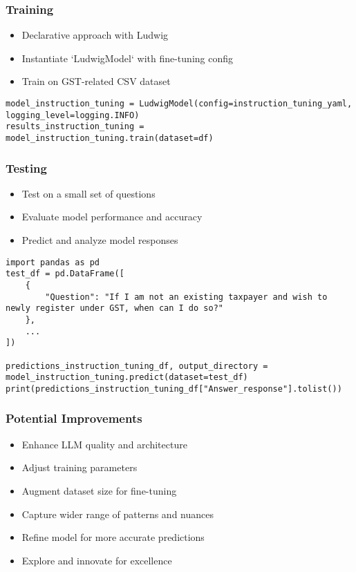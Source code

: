 \begin{frame}[fragile]\frametitle{Training}
\begin{itemize}
\item Declarative approach with Ludwig
\item Instantiate `LudwigModel` with fine-tuning config
\item Train on GST-related CSV dataset
\end{itemize}

\begin{lstlisting}
model_instruction_tuning = LudwigModel(config=instruction_tuning_yaml, logging_level=logging.INFO)
results_instruction_tuning = model_instruction_tuning.train(dataset=df)
\end{lstlisting}

\end{frame}

\begin{frame}[fragile]\frametitle{Testing}
\begin{itemize}
\item Test on a small set of questions
\item Evaluate model performance and accuracy
\item Predict and analyze model responses
\end{itemize}

\begin{lstlisting}
import pandas as pd
test_df = pd.DataFrame([
    {
        "Question": "If I am not an existing taxpayer and wish to newly register under GST, when can I do so?"
    },
    ...
])

predictions_instruction_tuning_df, output_directory = model_instruction_tuning.predict(dataset=test_df)
print(predictions_instruction_tuning_df["Answer_response"].tolist())
\end{lstlisting}


\end{frame}

\begin{frame}[fragile]\frametitle{Potential Improvements}
\begin{itemize}
\item Enhance LLM quality and architecture
\item Adjust training parameters
\item Augment dataset size for fine-tuning
\item Capture wider range of patterns and nuances
\item Refine model for more accurate predictions
\item Explore and innovate for excellence
\end{itemize}
\end{frame}


